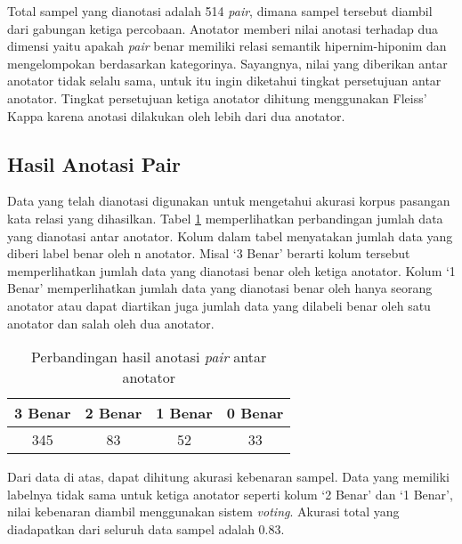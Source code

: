Total sampel yang dianotasi adalah 514 \textit{pair}, dimana sampel tersebut diambil dari gabungan ketiga percobaan. Anotator memberi nilai anotasi terhadap dua dimensi yaitu apakah \textit{pair} benar memiliki relasi semantik hipernim-hiponim dan mengelompokan berdasarkan kategorinya. Sayangnya, nilai yang diberikan antar anotator tidak selalu sama, untuk itu ingin diketahui tingkat persetujuan antar anotator. Tingkat persetujuan ketiga anotator dihitung menggunakan Fleiss' Kappa karena anotasi dilakukan oleh lebih dari dua anotator.

\subsection{Hasil Anotasi Pair}
Data yang telah dianotasi digunakan untuk mengetahui akurasi korpus pasangan kata relasi yang dihasilkan. Tabel \ref{table:jumlah-bs} memperlihatkan perbandingan jumlah data yang dianotasi antar anotator. Kolum dalam tabel menyatakan jumlah data yang diberi label benar oleh n anotator. Misal `3 Benar' berarti kolum tersebut memperlihatkan jumlah data yang dianotasi benar oleh ketiga anotator. Kolum `1 Benar' memperlihatkan jumlah data yang dianotasi benar oleh hanya seorang anotator atau dapat diartikan juga jumlah data yang dilabeli benar oleh satu anotator dan salah oleh dua anotator.

\begin{table}
  \centering
  \caption{Perbandingan hasil anotasi \textit{pair} antar anotator}
  \label{table:jumlah-bs}
  \begin{tabular}{|c|c|c|c|}
  \hline
  3 Benar & 2 Benar & 1 Benar & 0 Benar \\ \hline
  345 & 83 & 52 & 33 \\ \hline
  \end{tabular} 
\end{table}

Dari data di atas, dapat dihitung akurasi kebenaran sampel. Data yang memiliki labelnya tidak sama untuk ketiga anotator seperti kolum `2 Benar' dan `1 Benar', nilai kebenaran diambil menggunakan sistem \textit{voting}. Akurasi total yang diadapatkan dari seluruh data sampel adalah 0.83.

